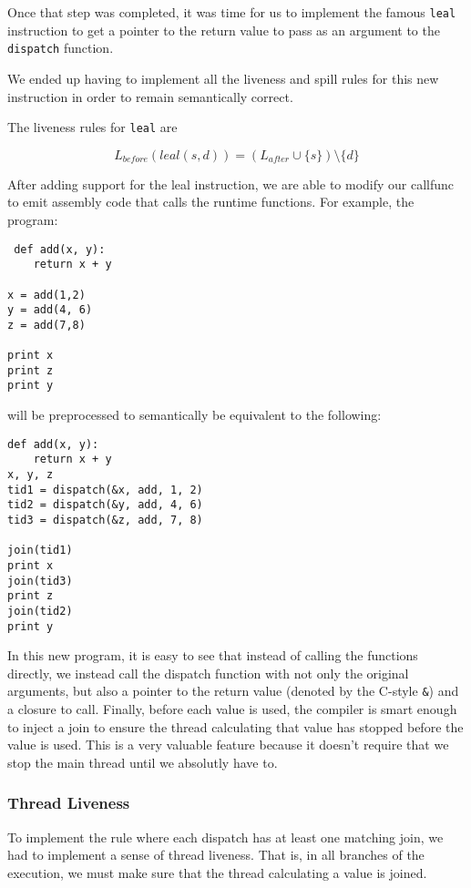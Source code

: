 \documentclass{acm_proc_article-sp}
\begin{document}
Once that step was completed, it was time for us to implement the famous \verb|leal| instruction
to get a pointer to the return value to pass as an argument to the \verb|dispatch|
function.

We ended up having to implement all the liveness and spill rules for this new instruction in order to remain semantically correct.

The liveness rules for \verb|leal| are

\[
L_{before}(leal(s,d)) = (L_{after} \cup \{s\}) \setminus \{d\}
\]

After adding support for the leal instruction, we are able to modify our callfunc
to emit assembly code that calls the runtime functions. For example, the program:

\begin{verbatim}
 def add(x, y):
	return x + y

x = add(1,2)
y = add(4, 6)
z = add(7,8)

print x
print z
print y
\end{verbatim}

will be preprocessed to semantically be equivalent to the following:

\begin{verbatim}
def add(x, y):
	return x + y
x, y, z
tid1 = dispatch(&x, add, 1, 2)
tid2 = dispatch(&y, add, 4, 6)
tid3 = dispatch(&z, add, 7, 8)

join(tid1)
print x
join(tid3)
print z
join(tid2)
print y
\end{verbatim}

In this new program, it is easy to see that instead of calling the functions directly,
we instead call the dispatch function with not only the original arguments, but also
a pointer to the return value (denoted by the C-style \verb|&|) and a closure to
call. Finally, before each value is used, the compiler is smart enough to inject a join
to ensure the thread calculating that value has stopped before the value is used. This
is a very valuable feature because it doesn't require that we stop the main thread until
we absolutly have to. 

\subsubsection*{Thread Liveness}

To implement the rule where each dispatch has at least one matching join, we
had to implement a sense of thread liveness. That is, in all branches of the
execution, we must make sure that the thread calculating a value is joined.
\end{document}
